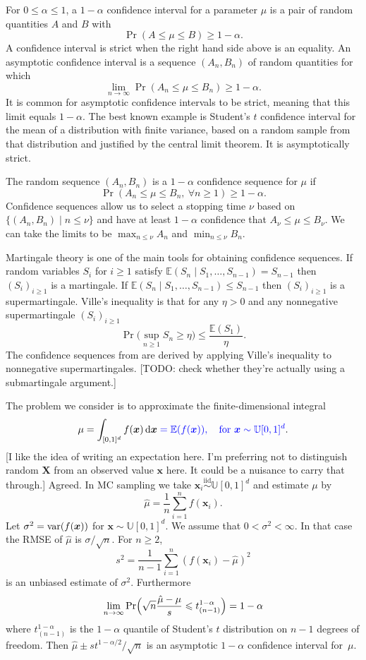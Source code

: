 \documentclass{article}
\newcommand{\art}[1]{\begingroup\color{blue}#1\endgroup}
\newcommand{\fred}[1]{\begingroup\color{red}#1\endgroup}
\renewcommand{\le}{\leqslant}
\renewcommand{\ge}{\geqslant}
\newcommand{\e}{\mathbb{E}}
\newcommand{\bsx}{\boldsymbol{x}}
\newcommand{\simiid}{\stackrel{\mathrm{iid}}{\sim}}
\newcommand{\dunif}{\mathbb{U}}
\newcommand{\giv}{\!\mid\!} %
\newcommand{\rd}{\,\mathrm{d}}
\begin{document}
For $0\le\alpha\le 1$, a $1-\alpha$ confidence interval for a 
parameter $\mu$ is a pair of random quantities $A$ and $B$ with
$$
\Pr( A\le \mu\le B)\ge 1-\alpha.
$$
A confidence interval is strict when the right hand
side above is an equality.
An asymptotic confidence interval is a sequence $(A_n,B_n)$
of random quantities for which
$$
\lim_{n\to\infty}\Pr( A_n\le \mu\le B_n)\ge 1-\alpha.
$$
It is common for asymptotic confidence intervals to
be strict, meaning that this limit equals $1-\alpha$.
The best known example is Student's $t$ confidence
interval for the mean of a distribution with finite
variance, based on a random sample 
from that distribution and justified by the
central limit theorem.  It is asymptotically strict.

The random sequence $(A_n,B_n)$ is a $1-\alpha$ confidence sequence
for $\mu$ if
$$
\Pr( A_n \le \mu \le B_n,\ \forall n\ge1)\ge 1-\alpha.
$$
Confidence sequences allow us to select a stopping time
$\nu$ based on $\{(A_n,B_n)\mid n\le\nu\}$ and have
at least $1-\alpha$ confidence that $A_\nu\le \mu\le B_\nu$.
We can take the limits to be $\max_{n\le \nu}A_n$
and $\min_{n\le\nu}B_n$.

Martingale theory is one of the main tools for
obtaining confidence sequences.
If random variables $S_i$ for $i\ge1$
satisfy $\e(S_n\giv S_1,\dots,S_{n-1})=S_{n-1}$
then $(S_i)_{i\ge1}$ is a martingale.
If $\e(S_n\giv S_1,\dots,S_{n-1})\le S_{n-1}$
then $(S_i)_{i\ge1}$ is a supermartingale.
Ville's inequality is that for any $\eta>0$
and any nonnegative supermartingale $(S_i)_{i\ge1}$
$$
\Pr\biggl( \sup_{n\ge1}S_n\ge \eta\biggr)\le\frac{\e(S_1)}\eta.
$$
The confidence sequences from \cite{WauRam24a} are derived
by applying Ville's inequality \cite{vill:1939} to nonnegative supermartingales.
\art{[TODO: check whether they're actually using a submartingale argument.]}


The problem we consider is to approximate the finite-dimensional
integral
$$\mu = \int_{[0,1]^d}f(\bsx)\rd\bsx 
\art{=\e(f(\bsx)),\quad\text{for $\bsx\sim\dunif[0,1]^d$}}.$$
\art{[I like the idea of writing an expectation here. I'm preferring not to distinguish
random $\boldsymbol{X}$ from an observed
value $\bsx$ here. It could be a nuisance to carry
that through.] } \fred{Agreed.}
In MC sampling we take $\bsx_i\simiid \dunif[0,1]^d$ and
estimate $\mu$ by
$$
\hat\mu = \frac1n\sum_{i=1}^nf(\bsx_i).
$$
Let $\sigma^2=\var(f(\bsx))$ for $\bsx\sim\dunif[0,1]^d$.
We assume that $0<\sigma^2<\infty$. In that case the RMSE
of $\hat\mu$ is $\sigma/\sqrt{n}$. For $n\ge2$,
$$s^2 =\frac1{n-1}\sum_{i=1}^n(f(\bsx_i)-\hat\mu)^2$$
is an unbiased estimate of $\sigma^2$. Furthermore
$$
\lim_{n\to\infty}\Pr\Bigl( \sqrt{n}\frac{\hat\mu-\mu}s\le t^{1-\alpha}_{(n-1)}\Bigr) = 1-\alpha
$$
where $t^{1-\alpha}_{(n-1)}$ is the $1-\alpha$ quantile of
Student's $t$ distribution on $n-1$ degrees of freedom.
Then $\hat\mu \pm st^{1-\alpha/2}/\sqrt{n}$ is an
asymptotic $1-\alpha$ confidence interval for~$\mu$.
\end{document}
